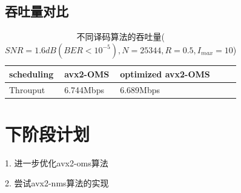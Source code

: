 \documentclass{article}
\begin{document}
\subsection{吞吐量对比}
\begin{table}[H]
	\caption{不同译码算法的吞吐量($SNR=1.6dB(BER<10^{-5}), N=25344,R=0.5,I_{max}=10$)}
	\centering
	\begin{tabular}{|l|l|l|l|l|}%
		\hline  %
		scheduling	&	avx2-OMS	& optimized avx2-OMS	\\
		\hline
		Throuput	&	6.744Mbps	& 6.689Mbps				\\
		\hline  %
	\end{tabular}
\end{table}



\section{下阶段计划}
1. 进一步优化avx2-oms算法

2. 尝试avx2-nms算法的实现
\end{document}
